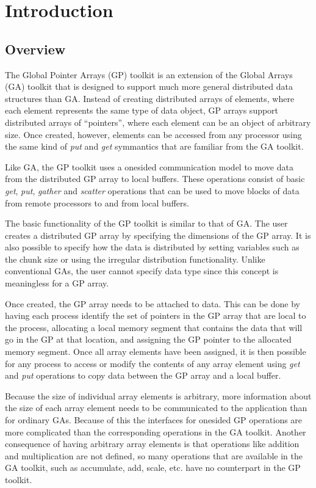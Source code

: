 \chapter{Introduction}

\section{Overview}

The Global Pointer Arrays (GP) toolkit is an extension of the Global Arrays
(GA) toolkit that is designed to support much more general distributed data
structures than GA. Instead of creating distributed arrays of elements, where
each element represents the same type of data object, GP arrays support
distributed arrays of ``pointers'', where each element can be an object of
arbitrary size. Once created, however, elements can be accessed from any
processor using the same kind of \emph{put} and \emph{get} symmantics that are familiar from
the GA toolkit.

Like GA, the GP toolkit uses a onesided communication model to move data from
the distributed GP array to local buffers. These operations consist of basic
\emph{get}, \emph{put}, \emph{gather} and \emph{scatter} operations that can be used to
move blocks of data from remote processors to and from local buffers.

The basic functionality of the GP toolkit is similar to that of GA. The user
creates a distributed GP array by specifying the dimensions of the GP array. It
is also possible to specify how the data is distributed by setting variables
such as the chunk size or using the irregular distribution functionality. Unlike
conventional GAs, the user cannot specify data type since this concept is
meaningless for a GP array.

Once created, the GP array needs to be attached to data. This can be done by
having each process identify the set of pointers in the GP array that are local
to the process, allocating a local memory segment that contains the data that
will go in the GP at that location, and assigning the GP pointer to the
allocated memory segment. Once all array elements have been assigned, it is then
possible for any process to access or modify the contents of any array element
using \emph{get} and \emph{put} operations to copy data between the GP array and a local
buffer.

Because the size of individual array elements is arbitrary, more information
about the size of each array element needs to be communicated to the application
than for ordinary GAs. Because of this the interfaces for onesided GP operations
are more complicated than the corresponding operations in the GA toolkit.
Another consequence of having arbitrary array elements is that operations like
addition and multiplication are not defined, so many operations that are
available in the GA toolkit, such as accumulate, add, scale, etc. have no
counterpart in the GP toolkit.

